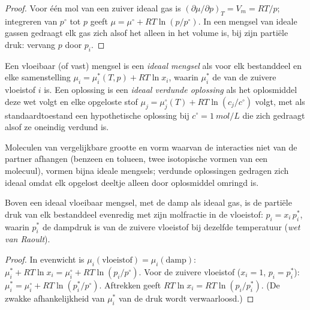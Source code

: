 \begin{proof}
Voor één mol van een zuiver ideaal gas is $(\partial\mu/\partial p)_T = V_m =
RT/p$; integreren van $p^\circ$ tot $p$ geeft $\mu = \mu^\circ + RT\ln(p/p^\circ)$.
In een mengsel van ideale gassen gedraagt elk gas zich alsof het alleen in het volume is, bij
zijn partiële druk: vervang $p$ door $p_i$.
\end{proof}

\begin{definition}\label{def:b2:chemical-potential:ideal-mixture}
Een vloeibaar (of vast) mengsel is een \emph{ideaal mengsel}
als voor elk bestanddeel en elke samenstelling
$\mu_i = \mu_i^*(T, p) + RT\ln x_i$, waarin $\mu_i^*$ de 
van de zuivere vloeistof $i$ is. Een oplossing is een \emph{ideaal verdunde
oplossing} als het oplosmiddel deze wet volgt en elke
opgeloste stof $\mu_j = \mu_j^\circ(T) + RT\ln(c_j/c^\circ)$ volgt, met als
standaardtoestand een hypothetische oplossing bij $c^\circ = \qty{1}{mol/L}$ die zich gedraagt
alsof ze oneindig verdund is.
\end{definition}

Moleculen van vergelijkbare grootte en vorm waarvan de interacties niet van de
partner afhangen (benzeen en tolueen, twee isotopische vormen van een molecuul), vormen
bijna ideale mengsels; verdunde oplossingen gedragen zich ideaal omdat elk opgelost
deeltje alleen door oplosmiddel omringd is.

\begin{theorem}\label{thm:b2:chemical-potential:raoult}
Boven een ideaal vloeibaar mengsel, met de damp als ideaal gas, is de partiële
druk van elk bestanddeel evenredig met zijn molfractie in de
vloeistof: $p_i = x_i\,p_i^*$, waarin $p_i^*$ de dampdruk is van de zuivere
vloeistof bij dezelfde temperatuur (\emph{wet van Raoult}).
\end{theorem}

\begin{proof}
In evenwicht is $\mu_i(\text{vloeistof}) = \mu_i(\text{damp})$: $\mu_i^* +
RT\ln x_i = \mu_i^\circ + RT\ln(p_i/p^\circ)$. Voor de zuivere vloeistof ($x_i = 1$,
$p_i = p_i^*$): $\mu_i^* = \mu_i^\circ + RT\ln(p_i^*/p^\circ)$. Aftrekken geeft
$RT\ln x_i = RT\ln(p_i/p_i^*)$. (De zwakke afhankelijkheid van $\mu_i^*$ van de
druk wordt verwaarloosd.)
\end{proof}

